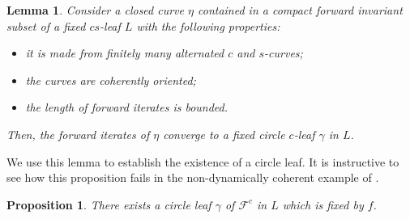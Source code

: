 \documentclass[11pt]{amsart} %
\newcommand{\cF}{\mathcal{F}}
\numberwithin{equation}{section}
\newtheorem{lemma}[equation]{Lemma}
\newtheorem{prop}[equation]{Proposition}
\theoremstyle{remark}
\begin{document}
\begin{lemma}\label{l.graphtransf}
Consider a closed curve $\eta$ contained in a compact forward invariant subset of a fixed $cs$-leaf $L$ with the following properties:
\begin{itemize}
\item it is made from finitely many alternated $c$ and $s$-curves;
\item the curves are coherently oriented;
\item the length of forward iterates is bounded.
%
\end{itemize}
Then, the forward iterates of $\eta$ converge to a fixed circle $c$-leaf $\gamma$ in $L$.
\end{lemma}
%

We use this lemma to establish the existence of a circle leaf. It is instructive to see how this proposition fails in the non-dynamically coherent example of \cite{HHU-example}.


\begin{prop}\label{prop-circleexist}
There exists a circle leaf $\gamma$ of $\cF^{c}$ in $L$ which is fixed by $f$. 
\end{prop}
\end{document}
